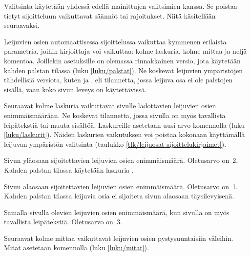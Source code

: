 Valitsinta \koodi{!} käytetään yhdessä edellä mainittujen valitsimien
 kanssa. Se poistaa tietyt sijoitteluun vaikuttavat säännöt
tai rajoitukset. Niitä käsitellään seuraavaksi.

Leijuvien osien automaattisessa sijoittelussa vaikuttaa kymmenen
erilaista parametria, joihin kirjoittaja voi vaikuttaa: kolme laskuria,
kolme mittaa ja neljä komentoa. Joillekin asetuksille on olemassa
rinnakkainen versio, jota käytetään kahden palstan tilassa (luku
\ref{luku/palstat}). Ne koskevat leijuvien ympäristöjen tähdellisiä
versiota, kuten  ja , eli
tilannetta, jossa leijuva osa ei ole palstojen sisällä, vaan koko sivun
leveys on käytettävissä.

Seuraavat kolme laskuria vaikuttavat sivulle ladottavien leijuvien osien
enimmäismäärään. Ne koskevat tilannetta, jossa sivulla on myös
tavallista leipätekstiä tai muuta sisältöä. Laskureille asetetaan uusi
arvo komennolla  (luku \ref{luku/laskurit}). Näiden
laskurien vaikutuksen voi poistaa kokonaan käyttämällä leijuvan
ympäristön valitsinta \koodi{!} (taulukko
\ref{tlk/leijuosat-sijoittelukirjaimet}).

\begin{maaritelma}{}
\item [topnumber] Sivun yläosaan sijoitettavien leijuvien osien
  enimmäismäärä. Oletusarvo on~2. Kahden palstan tilassa käytetään
  laskuria .
\item [bottomnumber] Sivun alaosaan sijoitettavien leijuvien osien
  enimmäismäärä. Oletusarvo on~1. Kahden palstan tilassa leijuvia osia
  ei sijoiteta sivun alaosaan täysilevyisenä.
\item [totalnumber] Samalla sivulla olevien leijuvien osien
  enimmäismäärä, kun sivulla on myös tavallista leipätekstiä. Oletusarvo
  on~3.
\end{maaritelma}

\noindent
Seuraavat kolme mittaa vaikuttavat leijuvien osien pystysuuntaisiin
väleihin. Mitat asetetaan komennolla  (luku
\ref{luku/mitat}).

